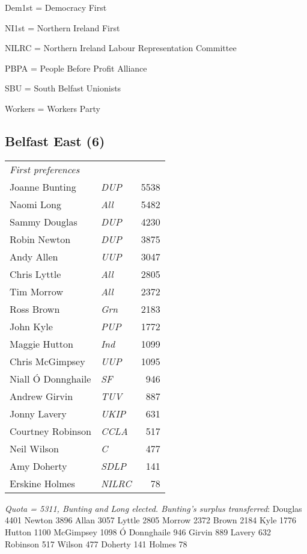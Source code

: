 Dem1st = Democracy First

NI1st = Northern Ireland First

NILRC = Northern Ireland Labour Representation Committee

PBPA = People Before Profit Alliance

%
%
SBU = South Belfast Unionists

%
%
Workers = Workers Party

\begin{resultsiii}

\subsection*{Belfast East (6)}


\noindent
\begin{tabular*}{\columnwidth}{@{\extracolsep{\fill}} p{} >{\itshape}l r @{\extracolsep{\fill}}}
\emph{First preferences}\\
Joanne Bunting & DUP & 5538\\
Naomi Long & All & 5482\\
Sammy Douglas & DUP & 4230\\
Robin Newton & DUP & 3875\\
Andy Allen & UUP & 3047\\
Chris Lyttle & All & 2805\\
Tim Morrow & All & 2372\\
Ross Brown & Grn & 2183\\
John Kyle & PUP & 1772\\
Maggie Hutton & Ind & 1099\\
Chris McGimpsey & UUP & 1095\\
Niall Ó Donnghaile & SF & 946\\
Andrew Girvin & TUV & 887\\
Jonny Lavery & UKIP & 631\\
Courtney Robinson & CCLA & 517\\
Neil Wilson & C & 477\\
Amy Doherty & SDLP & 141\\
Erskine Holmes & NILRC & 78\\
\end{tabular*}

\emph{Quota = 5311, Bunting and Long elected.  Bunting's surplus transferred}: Douglas 4401 Newton 3896 Allan 3057 Lyttle 2805 Morrow 2372 Brown 2184 Kyle 1776 Hutton 1100 McGimpsey 1098 Ó Donnghaile 946 Girvin 889 Lavery 632 Robinson 517 Wilson 477 Doherty 141 Holmes 78


\end{resultsiii}
